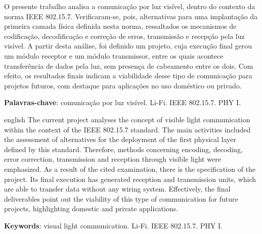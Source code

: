 
\setlength{\absparsep}{18pt} %
\begin{resumo}
	O presente trabalho analisa a comunicação por luz visível, dentro do contexto da norma IEEE 802.15.7. Verificaram-se, pois, alternativas para uma implantação da primeira camada física definida nesta norma, ressaltados os mecanismos de codificação, decodificação e correção de erros, transmissão e recepção pela luz visível. A partir desta análise, foi definido um projeto, cuja execução final gerou um módulo receptor e um módulo transmissor, entre os quais acontece transferência de dados pela luz, sem presença de cabeamento entre os dois. Com efeito, os resultados finais indicam a viabilidade desse tipo de comunicação para projetos futuros, com destaque para aplicações no uso doméstico ou privado. 
			
	\vspace{\onelineskip}
	\noindent 
	\textbf{Palavras-chave}: comunicação por luz visível. Li-Fi. IEEE 802.15.7. PHY I.
\end{resumo}

\begin{resumo}[Abstract]
	\begin{otherlanguage*}{english}
		The current project analyses the concept of visible light communication within the context of the IEEE 802.15.7 standard. The main activities included the assessment of alternatives for the deployment of the first physical layer defined by this standard. Therefore, methods concerning encoding, decoding, error correction, transmission and reception through visible light were emphasized. As a result of the cited examination, there is the specification of the project. Its final execution has generated reception and transmission units, which are able to transfer data without any wiring system. Effectively, the final deliverables point out the viability of this type of communication for future projects, highlighting domestic and private applications.
		
		\vspace{\onelineskip}
		\noindent 
		\textbf{Keywords}: visual light communication. Li-Fi. IEEE 802.15.7. PHY I.
	\end{otherlanguage*}
\end{resumo}